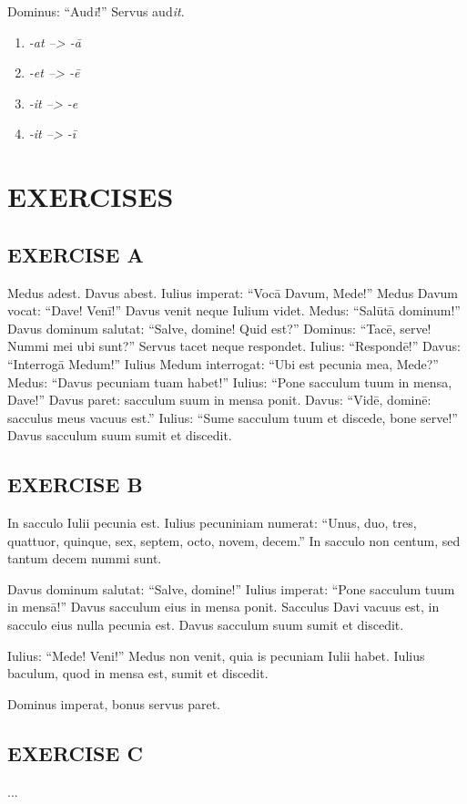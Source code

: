 Dominus: ``Aud\emph{\=i}!'' Servus aud\emph{it}.

\begin{enumerate}[(1)]
  \item \emph{-at --> -\=a}
  \item \emph{-et --> -\=e}
  \item \emph{-it --> -e}
  \item \emph{-it --> -\=i}
\end{enumerate}

\nolinenumbers

\section[Exercises]{EXERCISES}
\subsection*{EXERCISE A}
Medus adest. Davus abest. Iulius imperat: ``Voc\=a Davum, Mede!'' Medus Davum vocat: ``Dave! Ven\=i!'' Davus venit neque Iulium videt. Medus: ``Sal\=ut\=a dominum!'' Davus dominum salutat: ``Salve, domine! Quid est?'' Dominus: ``Tac\=e, serve! Nummi mei ubi sunt?'' Servus tacet neque respondet. Iulius: ``Respond\=e!'' Davus: ``Interrog\=a Medum!'' Iulius Medum interrogat: ``Ubi est pecunia mea, Mede?'' Medus: ``Davus pecuniam tuam habet!'' Iulius: ``Pone sacculum tuum in mensa, Dave!'' Davus paret: sacculum suum in mensa ponit. Davus: ``Vid\=e, domin\=e: sacculus meus vacuus est.'' Iulius: ``Sume sacculum tuum et discede, bone serve!'' Davus sacculum suum sumit et discedit.

\subsection*{EXERCISE B}
In sacculo Iulii pecunia est. Iulius pecuniniam numerat: ``Unus, duo, tres, quattuor, quinque, sex, septem, octo, novem, decem.'' In sacculo non centum, sed tantum decem nummi sunt.

Davus dominum salutat: ``Salve, domine!'' Iulius imperat: ``Pone sacculum tuum in mens\=a!'' Davus sacculum eius in mensa ponit. Sacculus Davi vacuus est, in sacculo eius nulla pecunia est. Davus sacculum suum sumit et discedit.

Iulius: ``Mede! Veni!'' Medus non venit, quia is pecuniam Iulii habet. Iulius baculum, quod in mensa est, sumit et discedit.

Dominus imperat, bonus servus paret.

\subsection*{EXERCISE C}
...
